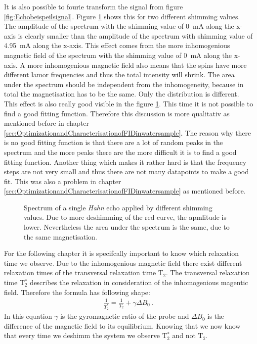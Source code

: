 It is also possible to fourie transform the signal from figure \ref{fig:Echobeispeilsignal}. Figure \ref{fig:SpinEcho} shows this for two different shimming values. The amplitude of the spectrum with the shimming value of \SI{0}{\milli \ampere} along the x-axis is clearly smaller than the amplitude of the spectrum with shimming value of \SI{4.95}{\milli \ampere} along the x-axis. This effect comes from the more inhomogenious magnetic field of the spectrum with the shimming value of \SI{0}{\milli \ampere} along the x-axis. A more inhomogenious magnetic field also means that the spins have more different lamor frequencies and thus the total intensity will shrink. The area under the spectrum should be independent from the inhomogeneity, because in total the magnetisation has to be the same. Only the distribution is different. This effect is also really good visible in the figure \ref{fig:SpinEcho}. This time it is not possible to find a good fitting function. Therefore this discussion is more qualitativ as mentioned before in chapter \ref{sec:OptimizationandCharacterisationofFIDinwatersample}. The reason why there is no good fitting function is that there are a lot of random peaks in the spectrum and the more peaks there are the more difficult it is to find a good fitting function. Another thing which makes it rather hard is that the frequency steps are not very small and thus there are not many datapoints to make a good fit. This was also a problem in chapter \ref{sec:OptimizationandCharacterisationofFIDinwatersample} as mentioned before.
\begin{figure}[H]
    \centering
    
    \caption[Spectrum of a single \textit{Hahn} echo applied by different shimming values.]{Spectrum of a single \textit{Hahn} echo applied by different shimming values. Due to more deshimming of the red curve, the apmlitude is lower. Nevertheless the area under the spectrum is the same, due to the same magnetisation.}
    \label{fig:SpinEcho}
\end{figure}
For the following chapter it is specifcally important to know which relaxation time we observe. Due to the inhomogenious magnetic field there exist different relaxation times of the transversal relaxation time T$_2$. The transversal relaxation time T$_2^*$ describes the relaxation in consideration of the inhomogenious magentic field. Therefore the formula has following shape:
\begin{align}
    \frac{1}{T_2^*} = \frac{1}{T_2} + \gamma \Delta B_0 \ .
    \label{eq: T2}
\end{align}
In this equation $\gamma$ is the gyromagnetic ratio of the probe and $\Delta B_0$ is the difference of the magnetic field to its equilibrium. Knowing that we now know that every time we deshimm the system we observe T$_2^*$ and not T$_2$.

